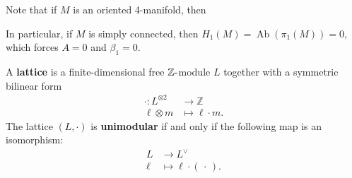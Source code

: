 \begin{remark}

Note that if \(M\) is an oriented 4-manifold, then

\begin{center}
\end{center}

In particular, if \(M\) is simply connected, then
\(H_1(M) = {\operatorname{Ab}}(\pi_1(M)) = 0\), which forces \(A = 0\)
and \(\beta_1 = 0\).

\end{remark}

\begin{definition}[Lattice]

A \textbf{lattice} is a finite-dimensional free
\({\mathbb{Z}}{\hbox{-}}\)module \(L\) together with a symmetric
bilinear form
\begin{align*}
\cdot: L^{\otimes 2} &\to {\mathbb{Z}}\\
\ell \otimes m &\mapsto \ell \cdot m
.\end{align*}
The lattice \((L, \cdot)\) is \textbf{unimodular} if and only if the
following map is an isomorphism:
\begin{align*}
L &\to L^\vee\\
\ell &\mapsto \ell \cdot ({\,\cdot\,})
.\end{align*}

\end{definition}

